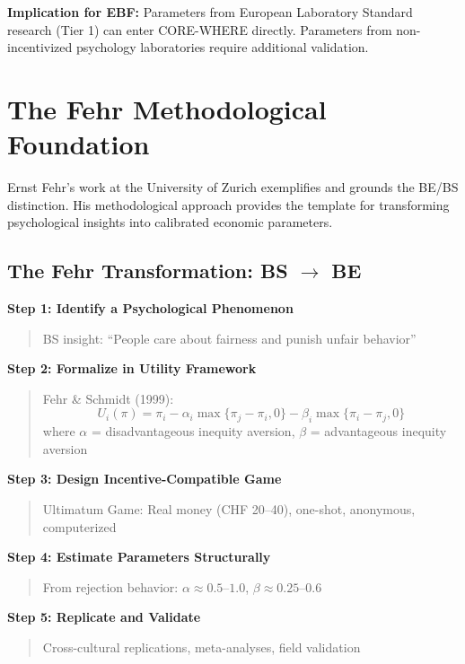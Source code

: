 \documentclass[11pt, a4paper]{article}
\begin{document}
\textbf{Implication for EBF:} Parameters from European Laboratory Standard research (Tier 1) can enter CORE-WHERE directly. Parameters from non-incentivized psychology laboratories require additional validation.


\section{The Fehr Methodological Foundation}
\label{sec:evd-fehr-foundation}

Ernst Fehr's work at the University of Zurich exemplifies and grounds the BE/BS distinction. His methodological approach provides the template for transforming psychological insights into calibrated economic parameters.

\subsection{The Fehr Transformation: BS $\to$ BE}

\begin{tcolorbox}[colback=green!5!white, colframe=green!75!black,
    title=The Fehr Recipe: From Concept to Parameter]

\textbf{Step 1: Identify a Psychological Phenomenon}
\begin{quote}
BS insight: ``People care about fairness and punish unfair behavior''
\end{quote}

\textbf{Step 2: Formalize in Utility Framework}
\begin{quote}
Fehr \& Schmidt (1999):
$$U_i(\pi) = \pi_i - \alpha_i \max\{\pi_j - \pi_i, 0\} - \beta_i \max\{\pi_i - \pi_j, 0\}$$
where $\alpha$ = disadvantageous inequity aversion, $\beta$ = advantageous inequity aversion
\end{quote}

\textbf{Step 3: Design Incentive-Compatible Game}
\begin{quote}
Ultimatum Game: Real money (CHF 20--40), one-shot, anonymous, computerized
\end{quote}

\textbf{Step 4: Estimate Parameters Structurally}
\begin{quote}
From rejection behavior: $\alpha \approx 0.5$--$1.0$, $\beta \approx 0.25$--$0.6$
\end{quote}

\textbf{Step 5: Replicate and Validate}
\begin{quote}
Cross-cultural replications, meta-analyses, field validation
\end{quote}

\end{tcolorbox}
\end{document}
